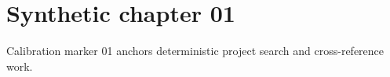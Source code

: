 \chapter{Synthetic chapter 01}\label{chap:01}
Calibration marker 01 anchors deterministic project search and cross-reference work.
